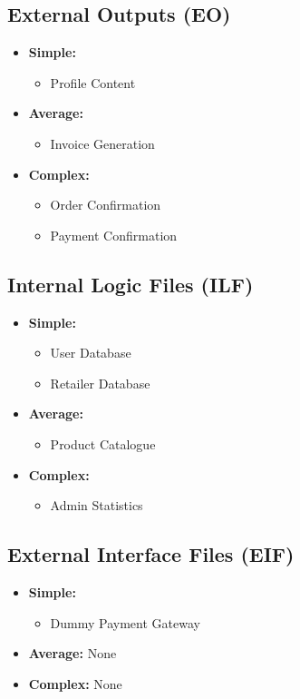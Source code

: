 \documentclass[a4paper,12pt]{article}
\begin{document}
\subsection{External Outputs (EO)}
\begin{itemize}
    \item \textbf{Simple:} 
    \begin{itemize}
        \item Profile Content
    \end{itemize}

    \item \textbf{Average:} 
    \begin{itemize}
        \item Invoice Generation
    \end{itemize}

    \item \textbf{Complex:}
    \begin{itemize}
        \item Order Confirmation
        \item Payment Confirmation
    \end{itemize}
\end{itemize}

\subsection{Internal Logic Files (ILF)}
\begin{itemize}
    \item \textbf{Simple:} 
    \begin{itemize}
        \item User Database
        \item Retailer Database
    \end{itemize}

    \item \textbf{Average:} 
    \begin{itemize}
        \item Product Catalogue
    \end{itemize}

    \item \textbf{Complex:}
    \begin{itemize}
        \item Admin Statistics
    \end{itemize}
\end{itemize}

\subsection{External Interface Files (EIF)}
\begin{itemize}
    \item \textbf{Simple:}
    \begin{itemize}
        \item Dummy Payment Gateway
    \end{itemize}
    \item \textbf{Average:} None
    \item \textbf{Complex:} None
\end{itemize}
\end{document}
